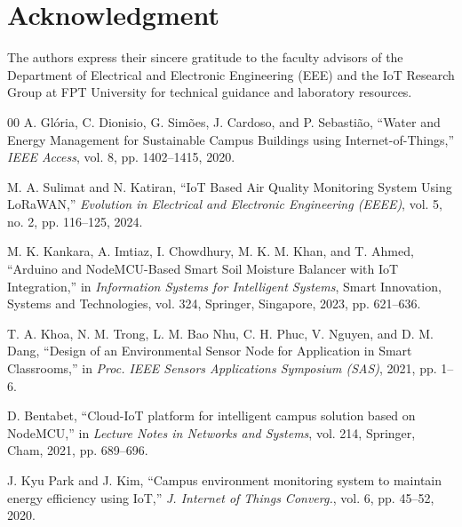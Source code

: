 \documentclass[conference]{IEEEtran}
\begin{document}
\section*{Acknowledgment}
The authors express their sincere gratitude to the faculty advisors of the Department of Electrical and Electronic Engineering (EEE) and the IoT Research Group at FPT University for technical guidance and laboratory resources.

\begin{thebibliography}{00}
A. Glória, C. Dionisio, G. Simões, J. Cardoso, and P. Sebastião, ``Water and Energy Management for Sustainable Campus Buildings using Internet-of-Things,'' \emph{IEEE Access}, vol. 8, pp. 1402--1415, 2020.

M. A. Sulimat and N. Katiran, ``IoT Based Air Quality Monitoring System Using LoRaWAN,'' \emph{Evolution in Electrical and Electronic Engineering (EEEE)}, vol. 5, no. 2, pp. 116--125, 2024.

M. K. Kankara, A. Imtiaz, I. Chowdhury, M. K. M. Khan, and T. Ahmed, ``Arduino and NodeMCU-Based Smart Soil Moisture Balancer with IoT Integration,'' in \emph{Information Systems for Intelligent Systems}, Smart Innovation, Systems and Technologies, vol. 324, Springer, Singapore, 2023, pp. 621--636.

T. A. Khoa, N. M. Trong, L. M. Bao Nhu, C. H. Phuc, V. Nguyen, and D. M. Dang, ``Design of an Environmental Sensor Node for Application in Smart Classrooms,'' in \emph{Proc. IEEE Sensors Applications Symposium (SAS)}, 2021, pp. 1--6.

D. Bentabet, ``Cloud-IoT platform for intelligent campus solution based on NodeMCU,'' in \emph{Lecture Notes in Networks and Systems}, vol. 214, Springer, Cham, 2021, pp. 689--696.

J. Kyu Park and J. Kim, ``Campus environment monitoring system to maintain energy efficiency using IoT,'' \emph{J. Internet of Things Converg.}, vol. 6, pp. 45--52, 2020.
\end{thebibliography}
\end{document}
